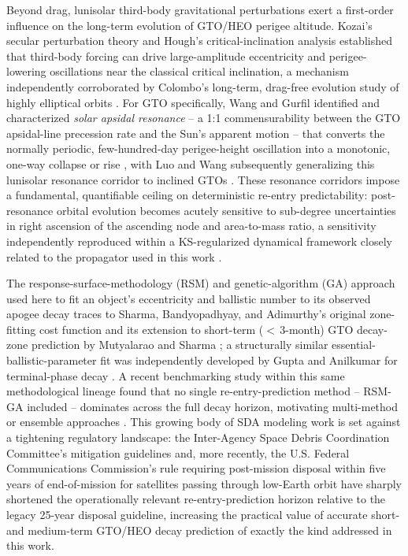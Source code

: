 Beyond drag, lunisolar third-body gravitational perturbations exert a
first-order influence on the long-term evolution of GTO/HEO perigee
altitude. Kozai's secular perturbation theory \cite{kozai1962} and Hough's
critical-inclination analysis \cite{hough1981} established that third-body
forcing can drive large-amplitude eccentricity and perigee-lowering
oscillations near the classical critical inclination, a mechanism
independently corroborated by Colombo's long-term, drag-free evolution
study of highly elliptical orbits \cite{colombo2015}. For GTO specifically,
Wang and Gurfil identified and characterized \emph{solar apsidal
resonance} -- a 1:1 commensurability between the GTO apsidal-line
precession rate and the Sun's apparent motion -- that converts the
normally periodic, few-hundred-day perigee-height oscillation into a
monotonic, one-way collapse or rise
\cite{wanggurfil2016,wanggurfil2017asr,wanggurfil2017jsr}, with Luo and
Wang subsequently generalizing this lunisolar resonance corridor to
inclined GTOs \cite{luowang2019}. These resonance corridors impose a
fundamental, quantifiable ceiling on deterministic re-entry predictability:
post-resonance orbital evolution becomes acutely sensitive to sub-degree
uncertainties in right ascension of the ascending node and area-to-mass
ratio, a sensitivity independently reproduced within a KS-regularized
dynamical framework closely related to the propagator used in this work
\cite{sellamuthusharma2021}.

The response-surface-methodology (RSM) and genetic-algorithm (GA) approach
used here to fit an object's eccentricity and ballistic number to its
observed apogee decay traces to Sharma, Bandyopadhyay, and Adimurthy's
original zone-fitting cost function \cite{sharmabandyopadhyay2006} and its
extension to short-term (${<}\,3$-month) GTO decay-zone prediction by
Mutyalarao and Sharma \cite{mutyalaraosharma2010,mutyalaraosharma2011}; a
structurally similar essential-ballistic-parameter fit was independently
developed by Gupta and Anilkumar for terminal-phase decay
\cite{guptaanilkumar2015}. A recent benchmarking study within this same
methodological lineage found that no single re-entry-prediction method --
RSM-GA included -- dominates across the full decay horizon, motivating
multi-method or ensemble approaches \cite{dutt2023}. This growing body of
SDA modeling work is set against a tightening regulatory landscape: the
Inter-Agency Space Debris Coordination Committee's mitigation guidelines
\cite{iadc2021} and, more recently, the U.S. Federal Communications
Commission's rule requiring post-mission disposal within five years of
end-of-mission for satellites passing through low-Earth orbit
\cite{fcc2022,fedreg2024} have sharply shortened the operationally relevant
re-entry-prediction horizon relative to the legacy 25-year disposal
guideline, increasing the practical value of accurate short- and
medium-term GTO/HEO decay prediction of exactly the kind addressed in this
work.
